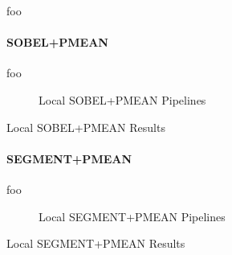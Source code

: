 foo

\paragraph{SOBEL+PMEAN}

foo

\begin{figure}[h]
    \centering
    
    \caption[Local SOBEL+PMEAN Pipelines]{
        Local SOBEL+PMEAN Pipelines
    }
    \label{fig:pipeline_local_luma_sobel_pmean}
\end{figure}

\begin{table}[h]
    \centering
    
    \caption[Local SOBEL+PMEAN Results]{
        Local SOBEL+PMEAN Results
    }
    \label{tab:results_local_luma_sobel_pmean}
\end{table}

\paragraph{SEGMENT+PMEAN}

foo

\begin{figure}[h]
    \centering
    
    \caption[Local SEGMENT+PMEAN Pipelines]{
        Local SEGMENT+PMEAN Pipelines
    }
    \label{fig:pipeline_local_luma_segment_pmean}
\end{figure}

\begin{table}[h]
    \centering
    
    \caption[Local SEGMENT+PMEAN Results]{
        Local SEGMENT+PMEAN Results
    }
    \label{tab:results_local_luma_segment_pmean}
\end{table}
